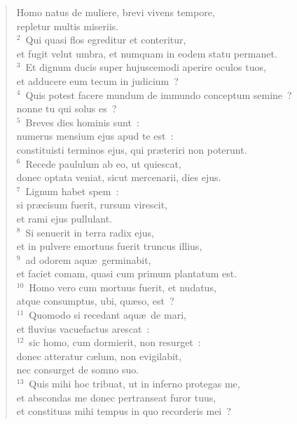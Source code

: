 \begin{flushleft}\begin{verse}\vspace{-19pt}\hspace{6pt}Homo natus de muliere, brevi vivens tempore,\\\hspace{6pt} repletur multis miseriis.\\
${}^{2}$~Qui quasi flos egreditur et conteritur,\\ et fugit velut umbra, et numquam in eodem statu permanet.\\
${}^{3}$~Et dignum ducis super hujuscemodi aperire oculos tuos,\\ et adducere eum tecum in judicium~?\\
${}^{4}$~Quis potest facere mundum de immundo conceptum semine~?\\ nonne tu qui solus es~?\\
${}^{5}$~Breves dies hominis sunt~:\\ numerus mensium ejus apud te est~:\\ constituisti terminos ejus, qui pr\ae teriri non poterunt.\\
${}^{6}$~Recede paululum ab eo, ut quiescat,\\ donec optata veniat, sicut mercenarii, dies ejus.\\
${}^{7}$~Lignum habet spem~:\\ si pr\ae cisum fuerit, rursum virescit,\\ et rami ejus pullulant.\\
${}^{8}$~Si senuerit in terra radix ejus,\\ et in pulvere emortuus fuerit truncus illius,\\
${}^{9}$~ad odorem aqu\ae\ germinabit,\\ et faciet comam, quasi cum primum plantatum est.\\
${}^{10}$~Homo vero cum mortuus fuerit, et nudatus,\\ atque consumptus, ubi, qu\ae so, est~?\\
${}^{11}$~Quomodo si recedant aqu\ae\ de mari,\\ et fluvius vacuefactus arescat~:\\
${}^{12}$~sic homo, cum dormierit, non resurget~:\\ donec atteratur c\ae lum, non evigilabit,\\ nec consurget de somno suo.\\
${}^{13}$~Quis mihi hoc tribuat, ut in inferno protegas me,\\ et abscondas me donec pertranseat furor tuus,\\ et constituas mihi tempus in quo recorderis mei~?\\

\end{verse}
\end{flushleft}
